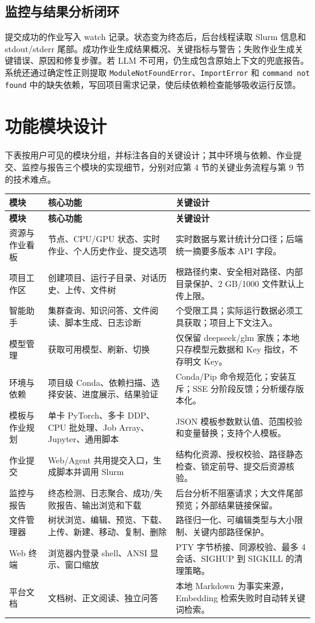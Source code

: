 \documentclass[UTF8,11pt,a4paper]{ctexart}
\newcommand{\code}[1]{\texttt{\small #1}}
\begin{document}
\subsection{监控与结果分析闭环}
提交成功的作业写入 watch 记录。状态变为终态后，后台线程读取 Slurm 信息和 stdout/stderr 尾部。成功作业生成结果概况、关键指标与警告；失败作业生成关键错误、原因和修复步骤。若 LLM 不可用，仍生成包含原始上下文的兜底报告。系统还通过确定性正则提取 \code{ModuleNotFoundError}、\code{ImportError} 和 \code{command not found} 中的缺失依赖，写回项目需求记录，使后续依赖检查能够吸收运行反馈。

\section{功能模块设计}
下表按用户可见的模块分组，并标注各自的关键设计；其中环境与依赖、作业提交、监控与报告三个模块的实现细节，分别对应第 4 节的关键业务流程与第 9 节的技术难点。

\begin{longtable}{>{\raggedright\arraybackslash}p{29mm}>{\raggedright\arraybackslash}p{59mm}>{\raggedright\arraybackslash}p{61mm}}
\toprule
\textbf{模块} & \textbf{核心功能} & \textbf{关键设计}\\
\midrule
\endfirsthead
\toprule
\textbf{模块} & \textbf{核心功能} & \textbf{关键设计}\\
\midrule
\endhead
资源与作业看板 & 节点、CPU/GPU 状态、实时作业、个人历史作业、提交选项 & 实时数据与累计统计分口径；后端统一摘要多版本 API 字段。\\
项目工作区 & 创建项目、运行子目录、对话历史、上传、文件树 & 根路径约束、安全相对路径、内部目录保护、2 GB/1000 文件默认上传上限。\\
智能助手 & 集群查询、知识问答、文件阅读、脚本生成、日志诊断 & 19 个受限工具；实际运行数据必须工具获取；项目上下文注入。\\
模型管理 & 获取可用模型、刷新、切换 & 仅保留 deepseek/glm 家族；本地只存模型元数据和 Key 指纹，不存明文 Key。\\
环境与依赖 & 项目级 Conda、依赖扫描、选择安装、进度展示、结果验证 & Conda/Pip 命令规范化；安装互斥；SSE 分阶段反馈；分析缓存版本化。\\
模板与作业规划 & 单卡 PyTorch、多卡 DDP、CPU 批处理、Job Array、Jupyter、通用脚本 & JSON 模板参数默认值、范围校验和变量替换；支持个人模板。\\
作业提交 & Web/Agent 共用提交入口，生成脚本并调用 Slurm & 结构化资源、授权校验、路径静态检查、锁定前导、提交后资源核验。\\
监控与报告 & 终态检测、日志聚合、成功/失败报告、输出浏览和下载 & 后台分析不阻塞请求；大文件尾部预览；外部结果链接保留。\\
文件管理器 & 树状浏览、编辑、预览、下载、上传、新建、移动、复制、删除 & 路径归一化、可编辑类型与大小限制、关键内部路径保护。\\
Web 终端 & 浏览器内登录 shell、ANSI 显示、窗口缩放 & PTY 字节桥接、同源校验、最多 4 会话、SIGHUP 到 SIGKILL 的清理策略。\\
平台文档 & 文档树、正文阅读、独立问答 & 本地 Markdown 为事实来源，Embedding 检索失败时自动转关键词检索。\\
\bottomrule
\end{longtable}
\end{document}
